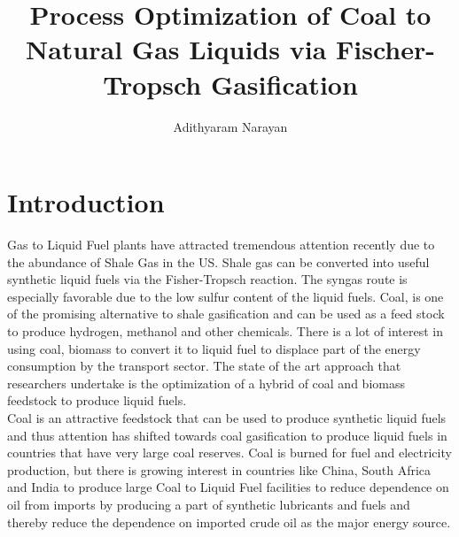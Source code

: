 \documentclass[journal=iecred,manuscript=article]{achemso}
\title{Process Optimization of Coal to Natural Gas Liquids via Fischer-Tropsch Gasification}
\author{Adithyaram Narayan}
\affiliation{Mary Kay O'Connor Process Safety Center, Artie McFerrin Department of Chemical Engineering, Texas A\&M University, College Station, Texas 77843-3122, USA}
\begin{document}

\section*{Introduction}
Gas to Liquid Fuel plants have attracted tremendous attention recently due to the abundance of Shale Gas in the US. Shale gas can be converted into useful synthetic liquid fuels via the Fisher-Tropsch reaction. The syngas route is especially favorable due to the low sulfur content of the liquid fuels. Coal, is one of the promising alternative to shale gasification and can be  used as a feed stock to produce hydrogen, methanol and other chemicals. There is a lot of interest in using coal, biomass to convert it to liquid fuel to displace part of the energy consumption by the transport sector\cite{ref22}. The state of the art approach that researchers undertake is the optimization of a hybrid of coal and biomass feedstock to produce liquid fuels\cite{Floudas201224}.\\

Coal is an attractive feedstock that can be used to produce synthetic liquid fuels and thus attention has shifted towards coal gasification to produce liquid fuels in countries that have very large coal reserves\cite{Steynberg199941}. Coal is burned for fuel and electricity production, but there is growing interest in countries like China, South Africa and India to produce large Coal to Liquid Fuel facilities to reduce dependence on oil from imports by producing a part of synthetic lubricants and fuels\cite{Steynberg2004765} and thereby reduce the dependence on imported crude oil as the major energy source.  \\
\end{document}
